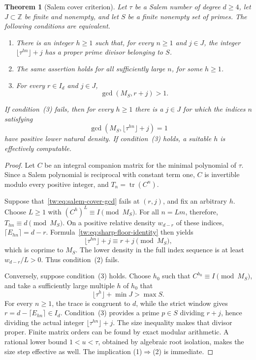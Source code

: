\documentclass[11pt,a4paper]{article}
\newtheorem{theorem}{Theorem}[section]
\theoremstyle{definition}
\theoremstyle{remark}
\numberwithin{equation}{section}
\begin{document}
\begin{theorem}[Salem cover criterion]\label{tw:thm:salem-cover-exact}
Let $\tau$ be a Salem number of degree $d\ge4$, let $J\subset\mathbb Z$
be finite and nonempty, and let $S$ be a finite nonempty set of primes.
The following conditions are equivalent.
\begin{enumerate}
\item There is an integer $h\ge1$ such that, for every $n\ge1$ and
$j\in J$, the integer $\lfloor\tau^{hn}\rfloor+j$ has a proper prime
divisor belonging to $S$.
\item The same assertion holds for all sufficiently large $n$, for some
$h\ge1$.
\item For every $r\in I_d$ and $j\in J$,
\begin{equation}\label{tw:eq:salem-cover-gcd}
 \gcd(M_S,r+j)>1.
\end{equation}
\end{enumerate}
If condition~\textup{(3)} fails, then for every $h\ge1$ there is a
$j\in J$ for which the indices $n$ satisfying
\[
 \gcd(M_S,\lfloor\tau^{hn}\rfloor+j)=1
\]
have positive lower natural density.  If condition~\textup{(3)} holds,
a suitable $h$ is effectively computable.
\end{theorem}
\begin{proof}
Let $C$ be an integral companion matrix for the minimal polynomial of
$\tau$.  Since a Salem polynomial is reciprocal with constant term one,
$C$ is invertible modulo every positive integer, and
$T_n=\operatorname{tr}(C^n)$.

Suppose that~\eqref{tw:eq:salem-cover-gcd} fails at $(r,j)$, and fix an
arbitrary $h$.  Choose $L\ge1$ with $(C^h)^L\equiv I\pmod{M_S}$.
For all $n=Lm$, therefore, $T_{hn}\equiv d\pmod{M_S}$.  On a positive
relative density $w_{d-r}$ of these indices,
$\lceil E_{hn}\rceil=d-r$.  Formula~\eqref{tw:eq:sharp-floor-identity}
then yields
\[
 \lfloor\tau^{hn}\rfloor+j\equiv r+j\pmod{M_S},
\]
which is coprime to $M_S$.  The lower density in the full index sequence
is at least $w_{d-r}/L>0$.  Thus condition~(2) fails.

Conversely, suppose condition~(3) holds.  Choose $h_0$ such that
$C^{h_0}\equiv I\pmod{M_S}$, and take a sufficiently large multiple
$h$ of $h_0$ that
\[
 \lfloor\tau^h\rfloor+\min J>\max S.
\]
For every $n\ge1$, the trace is congruent to $d$, while the strict
window gives $r=d-\lceil E_{hn}\rceil\in I_d$.  Condition~(3)
provides a prime $p\in S$ dividing $r+j$, hence dividing the actual
integer $\lfloor\tau^{hn}\rfloor+j$.  The size inequality makes that
divisor proper.  Finite matrix orders can be found by exact modular
arithmetic.  A rational lower bound $1<u<\tau$, obtained by algebraic
root isolation, makes the size step effective as well.  The implication
(1)$\Rightarrow$(2) is immediate.
\end{proof}
\end{document}
